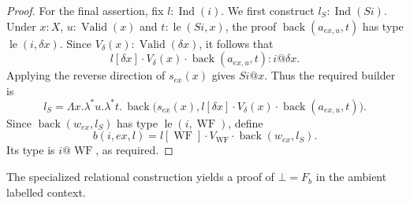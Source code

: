 \begin{proof}
For the final assertion, fix $l:\operatorname{Ind}(i)$.  We first
construct $l_S:\operatorname{Ind}(Si)$.  Under $x:X$,
$u:\operatorname{Valid}(x)$ and $t:\operatorname{le}(Si,x)$,
the proof $\operatorname{back}(a_{ex,u},t)$ has type
$\operatorname{le}(i,\delta x)$.  Since
$V_\delta(x):\operatorname{Valid}(\delta x)$, it follows that
\[
 l[\delta x]\cdot V_\delta(x)\cdot
                   \operatorname{back}(a_{ex,u},t):i@\delta x.
\]
Applying the reverse direction of $s_{ex}(x)$ gives $Si@x$.
Thus the required builder is
\[
 l_S=\Lambda x.\lambda^*u.\lambda^*t.\,
 \operatorname{back}\bigl(s_{ex}(x),
       l[\delta x]\cdot V_\delta(x)\cdot
                   \operatorname{back}(a_{ex,u},t)\bigr).
\]
Since $\operatorname{back}(w_{ex},l_S)$ has type
$\operatorname{le}(i,\operatorname{WF})$, define
\[
 b(i,ex,l)=
 l[\operatorname{WF}]\cdot V_{\operatorname{WF}}\cdot
                      \operatorname{back}(w_{ex},l_S).
\]
Its type is $i@\operatorname{WF}$, as required.
\end{proof}

\begin{proposition}
\label{rel-contradiction}
The specialized relational construction yields a proof of
$\bot=F_b$ in the ambient labelled context.
\end{proposition}

